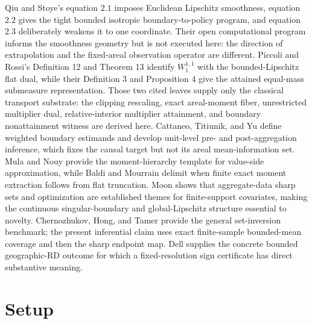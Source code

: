 \documentclass{article}
\begin{document}
Qiu and Stoye's equation \(2.1\) imposes Euclidean Lipschitz smoothness, equation \(2.2\) gives the tight bounded isotropic boundary-to-policy program, and equation \(2.3\) deliberately weakens it to one coordinate. Their open computational program informs the smoothness geometry but is not executed here: the direction of extrapolation and the fixed-areal observation operator are different. Piccoli and Rossi's Definition 12 and Theorem 13 identify \(W_1^{1,1}\) with the bounded-Lipschitz flat dual, while their Definition 3 and Proposition 4 give the attained equal-mass submeasure representation. Those two cited leaves supply only the classical transport substrate: the clipping rescaling, exact areal-moment fiber, unrestricted multiplier dual, relative-interior multiplier attainment, and boundary nonattainment witness are derived here. Cattaneo, Titiunik, and Yu define weighted boundary estimands and develop unit-level pre- and post-aggregation inference, which fixes the causal target but not its areal mean-information set. Mula and Nouy provide the moment-hierarchy template for value-side approximation, while Baldi and Mourrain delimit when finite exact moment extraction follows from flat truncation. Moon shows that aggregate-data sharp sets and optimization are established themes for finite-support covariates, making the continuous singular-boundary and global-Lipschitz structure essential to novelty. Chernozhukov, Hong, and Tamer provide the general set-inversion benchmark; the present inferential claim uses exact finite-sample bounded-mean coverage and then the sharp endpoint map. Dell supplies the concrete bounded geographic-RD outcome for which a fixed-resolution sign certificate has direct substantive meaning.

\section{Setup}
\end{document}
